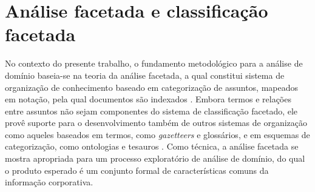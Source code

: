 






\section{Análise facetada e classificação facetada}
\label{classificacaoFacetada}

No contexto do presente trabalho, o fundamento metodológico para a análise de domínio baseia-se na teoria da análise facetada, a qual constitui sistema de organização de conhecimento baseado em categorização de assuntos, mapeados em notação, pela qual documentos são indexados \cite{campos04}. Embora termos e relações entre assuntos não sejam componentes do sistema de classificação facetado, ele provê suporte para o desenvolvimento também de outros sistemas de organização como aqueles baseados em termos, como \textit{gazetteers} e glossários, e em esquemas de categorização, como ontologias e tesauros \cite{campos04}. Como técnica, a análise facetada se mostra apropriada para um processo exploratório de análise de domínio, do qual o produto esperado é um conjunto formal de características comuns da informação corporativa.

